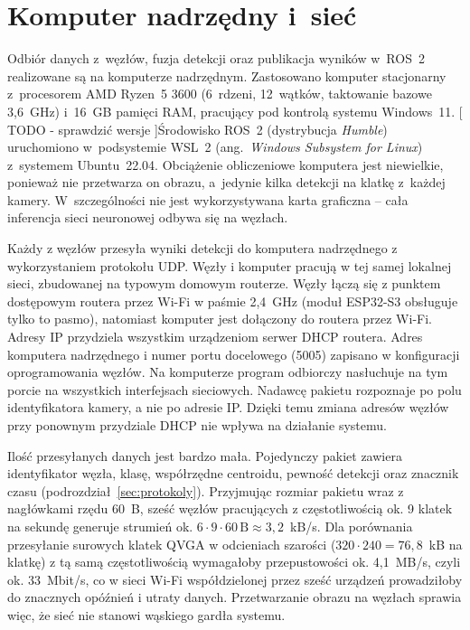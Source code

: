 \section{Komputer nadrzędny i~sieć}
\label{sec:komputer-siec}
Odbiór danych z~węzłów, fuzja detekcji oraz publikacja wyników w~ROS~2
realizowane są na komputerze nadrzędnym. Zastosowano komputer stacjonarny
z~procesorem AMD Ryzen~5 3600 (6~rdzeni, 12~wątków, taktowanie bazowe
3,6~GHz) i~16~GB pamięci RAM, pracujący pod kontrolą systemu Windows~11.
[ TODO - sprawdzić wersje ]Środowisko ROS~2 (dystrybucja \textit{Humble}) uruchomiono w~podsystemie
WSL~2 (ang.~\textit{Windows Subsystem for Linux}) z~systemem Ubuntu~22.04.
Obciążenie obliczeniowe komputera jest niewielkie, ponieważ nie przetwarza
on obrazu, a~jedynie kilka detekcji na klatkę z~każdej kamery.
W~szczególności nie jest wykorzystywana karta graficzna -- cała inferencja
sieci neuronowej odbywa się na węzłach.

Każdy z węzłów przesyła wyniki detekcji do komputera nadrzędnego
z wykorzystaniem protokołu UDP. Węzły i komputer pracują w tej samej
lokalnej sieci, zbudowanej na typowym domowym routerze. Węzły łączą się
z punktem dostępowym routera przez Wi-Fi w paśmie 2,4~GHz (moduł ESP32-S3
obsługuje tylko to pasmo), natomiast komputer jest dołączony do routera
przez Wi-Fi. Adresy IP przydziela
wszystkim urządzeniom serwer DHCP routera. Adres komputera nadrzędnego
i numer portu docelowego (5005) zapisano w konfiguracji oprogramowania
węzłów. Na komputerze program odbiorczy nasłuchuje na tym porcie na
wszystkich interfejsach sieciowych. Nadawcę pakietu rozpoznaje po polu
identyfikatora kamery, a nie po adresie IP. Dzięki temu zmiana adresów
węzłów przy ponownym przydziale DHCP nie wpływa na działanie systemu.

Ilość przesyłanych danych jest bardzo mała. Pojedynczy pakiet zawiera
identyfikator węzła, klasę, współrzędne centroidu, pewność detekcji oraz
znacznik czasu (podrozdział~\ref{sec:protokoly}). Przyjmując rozmiar
pakietu wraz z nagłówkami rzędu 60~B, sześć węzłów pracujących
z częstotliwością ok. 9 klatek na sekundę generuje strumień ok.
$6 \cdot 9 \cdot 60\,\mathrm{B} \approx 3{,}2$~kB/s.
Dla porównania przesyłanie surowych klatek QVGA w odcieniach szarości
($320 \cdot 240 = 76{,}8$~kB na klatkę) z tą samą częstotliwością
wymagałoby przepustowości ok. 4,1~MB/s, czyli ok. 33~Mbit/s, co w sieci
Wi-Fi współdzielonej przez sześć urządzeń prowadziłoby do znacznych
opóźnień i utraty danych. Przetwarzanie obrazu na węzłach sprawia więc, że
sieć nie stanowi wąskiego gardła systemu.


